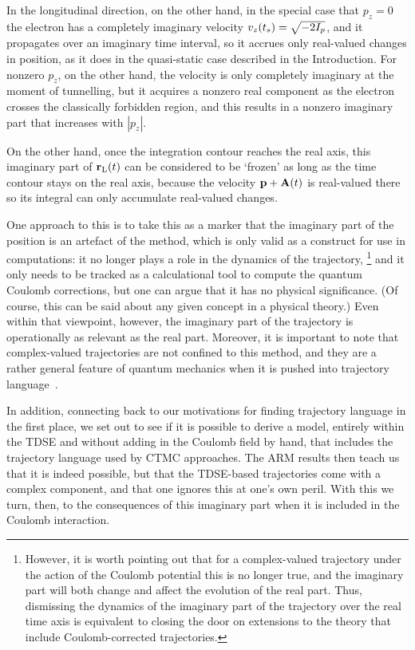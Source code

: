 In the longitudinal direction, on the other hand, in the special case that $p_z=0$ the electron has a completely imaginary velocity $v_z({t_s})=\sqrt{-2I_p}$, and it propagates over an imaginary time interval, so it accrues only real-valued changes in position, as it does in the quasi-static case described in the Introduction. For nonzero $p_z$, on the other hand, the velocity is only completely imaginary at the moment of tunnelling, but it acquires a nonzero real component as the electron crosses the classically forbidden region, and this results in a nonzero imaginary part that increases with $|p_z|$.

On the other hand, once the integration contour reaches the real axis, this imaginary part of $\vb{r}_\mathrm{L}(t)$ can be considered to be `frozen' as long as the time contour stays on the real axis, because the velocity $\vb{p}+\vb{A}(t)$ is real-valued there so its integral can only accumulate real-valued changes. 

One approach to this is to take this as a marker that the imaginary part of the position is an artefact of the method, which is only valid as a construct for use in computations: it no longer plays a role in the dynamics of the trajectory,%
%
\footnote{%
However, it is worth pointing out that for a complex-valued trajectory under the action of the Coulomb potential this is no longer true, and the imaginary part will both change and affect the evolution of the real part. Thus, dismissing the dynamics of the imaginary part of the trajectory over the real time axis is equivalent to closing the door on extensions to the theory that include Coulomb-corrected trajectories.
}
and it only needs to be tracked as a calculational tool to compute the quantum Coulomb corrections, but one can argue that it has no physical significance. (Of course, this can be said about any given concept in a physical theory.) Even within that viewpoint, however, the imaginary part of the trajectory is operationally as relevant as the real part. Moreover, it is important to note that complex-valued trajectories are not confined to this method, and they are a rather general feature of quantum mechanics when it is pushed into trajectory language~\cite{goldfarb-tannor_bohmian-complex_2006, goldfarb-tannor_complex-trajectory-wkb_2008, schiff-tannor_path-integral-complex-trajectory_2011}. 

In addition, connecting back to our motivations for finding trajectory language in the first place, we set out to see if it is possible to derive a model, entirely within the TDSE and without adding in the Coulomb field by hand, that includes the trajectory language used by CTMC approaches. The ARM results then teach us that it is indeed possible, but that the TDSE-based trajectories come with a complex component, and that one ignores this at one's own peril. With this we turn, then, to the consequences of this imaginary part when it is included in the Coulomb interaction.











